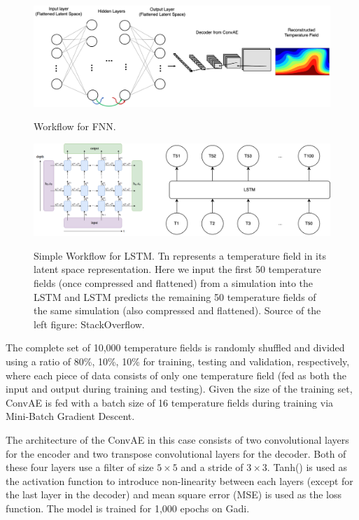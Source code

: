 \begin{figure}[H]
    \centering
    \caption{Workflow for FNN.}
    \includegraphics[scale=0.35]{figures/mantle_convection_images/FNN_workflow.png}
    \label{figure:FNN_workflow}
\end{figure}

\begin{figure}[H]
    \centering
    \caption{Simple Workflow for LSTM. Tn represents a temperature field in its latent space representation. Here we input the first 50 temperature fields (once compressed and flattened) from a simulation into the LSTM and LSTM  predicts the remaining 50 temperature fields of the same simulation (also compressed and flattened). Source of the left figure: StackOverflow.}
    \includegraphics[scale=0.6]{figures/mantle_convection_images/LSTM_workflow.png}
    \label{figure:LSTM_workflow}
\end{figure}

The complete set of 10,000 temperature fields is randomly shuffled and divided using a ratio of 80\%, 10\%, 10\% for training, testing and validation, respectively, where each piece of data consists of only one temperature field (fed as both the input and output during training and testing). Given the size of the training set, ConvAE is fed with a batch size of 16 temperature fields during training via Mini-Batch Gradient Descent.

The architecture of the ConvAE in this case consists of two convolutional layers for the encoder and two transpose convolutional layers for the decoder. Both of these four layers use a filter of size $5 \times 5$ and a stride of $3 \times 3$. Tanh() is used as the activation function to introduce non-linearity between each layers (except for the last layer in the decoder) and mean square error (MSE) is used as the loss function. The model is trained for 1,000 epochs on Gadi.

